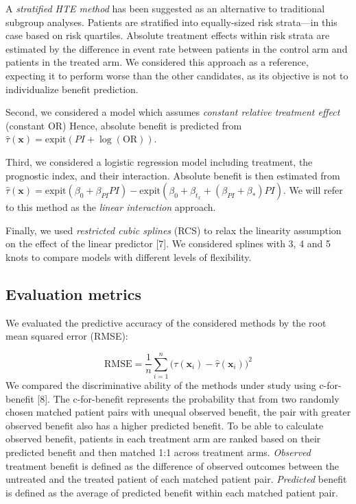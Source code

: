 \documentclass{article}
\begin{document}
A \emph{stratified HTE method} has been suggested as an alternative to
traditional subgroup analyses. Patients are stratified into
equally-sized risk strata---in this case based on risk quartiles.
Absolute treatment effects within risk strata are estimated by the
difference in event rate between patients in the control arm and
patients in the treated arm. We considered this approach as a reference,
expecting it to perform worse than the other candidates, as its
objective is not to individualize benefit prediction.

Second, we considered a model which assumes \emph{constant relative
treatment effect} (constant OR) Hence, absolute benefit is predicted
from \(\hat{\tau}(\bm{x}) = \text{expit}(PI +\log(\text{OR}))\).

Third, we considered a logistic regression model including treatment,
the prognostic index, and their interaction. Absolute benefit is then
estimated from
\(\hat{\tau}(\bm{x})=\text{expit}(\beta_0+\beta_{PI}PI) - \text{expit}(\beta_0+\beta_{t_x}+(\beta_{PI}+\beta_*)PI)\).
We will refer to this method as the \emph{linear interaction} approach.

Finally, we used \emph{restricted cubic splines} (RCS) to relax the
linearity assumption on the effect of the linear predictor {[}7{]}. We
considered splines with 3, 4 and 5 knots to compare models with
different levels of flexibility.

\hypertarget{evaluation-metrics}{%
\subsection{Evaluation metrics}\label{evaluation-metrics}}

We evaluated the predictive accuracy of the considered methods by the
root mean squared error (RMSE):

\[\text{RMSE}=\frac{1}{n}\sum_{i=1}^n\big(\tau(\bm{x}_i) - \hat{\tau}(\bm{x}_i)\big)^2\]
We compared the discriminative ability of the methods under study using
c-for-benefit {[}8{]}. The c-for-benefit represents the probability that
from two randomly chosen matched patient pairs with unequal observed
benefit, the pair with greater observed benefit also has a higher
predicted benefit. To be able to calculate observed benefit, patients in
each treatment arm are ranked based on their predicted benefit and then
matched 1:1 across treatment arms. \emph{Observed} treatment benefit is
defined as the difference of observed outcomes between the untreated and
the treated patient of each matched patient pair. \emph{Predicted}
benefit is defined as the average of predicted benefit within each
matched patient pair.
\end{document}
